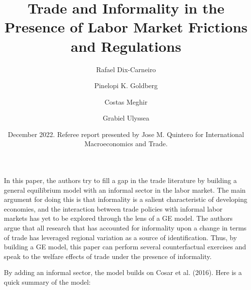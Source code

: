 \documentclass[12pt,oneside,reqno]{amsart}
\title{Trade and Informality in the Presence of Labor Market Frictions and Regulations}
\author{Rafael Dix-Carneiro \and Pinelopi K. Goldberg \and Costas Meghir \and Grabiel Ulyssea}
\date{December 2022. Referee report presented by Jose M. Quintero for International Macroeconomics and Trade.}
\begin{document}
\maketitle 

In this paper, the authors try to fill a gap in the trade literature by building a general equilibrium model with an informal sector in the labor market. The main argument for doing this is that informality is a salient characteristic of developing economies, and the interaction between trade policies with informal labor markets has yet to be explored through the lens of a GE model. The authors argue that all research that has accounted for informality upon a change in terms of trade has leveraged regional variation as a source of identification. Thus, by building a GE model, this paper can perform several counterfactual exercises and speak to the welfare effects of trade under the presence of informality. 

By adding an informal sector, the model builds on Cosar et al. (2016). Here is a quick summary of the model:
\end{document}
